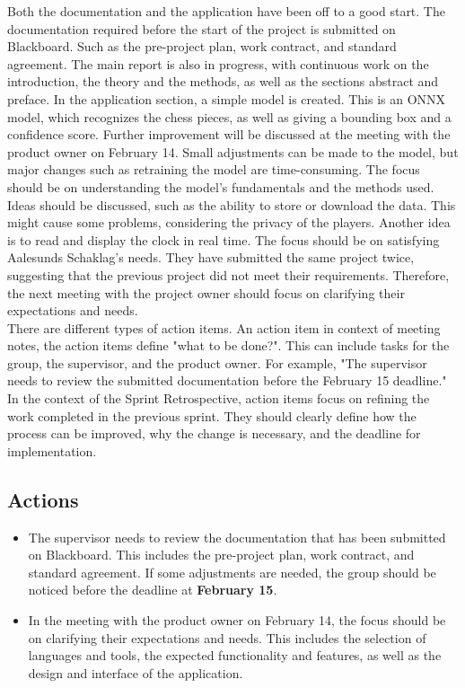 Both the documentation and the application have been off to a good start. The documentation required before the start of the project is submitted on Blackboard. Such as the pre-project plan, work contract, and standard agreement. The main report is also in progress, with continuous work on the introduction, the theory and the methods, as well as the sections abstract and preface. In the application section, a simple model is created. This is an ONNX model, which recognizes the chess pieces, as well as giving a bounding box and a confidence score. Further improvement will be discussed at the meeting with the product owner on February 14. Small adjustments can be made to the model, but major changes such as retraining the model are time-consuming. The focus should be on understanding the model's fundamentals and the methods used. Ideas should be discussed, such as the ability to store or download the data. This might cause some problems, considering the privacy of the players. Another idea is to read and display the clock in real time. The focus should be on satisfying Aalesunds Schaklag's needs. They have submitted the same project twice, suggesting that the previous project did not meet their requirements. Therefore, the next meeting with the project owner should focus on clarifying their expectations and needs. \\

There are different types of action items. An action item in context of meeting notes, the action items define "what to be done?". This can include tasks for the group, the supervisor, and the product owner. For example, "The supervisor needs to review the submitted documentation before the February 15 deadline." \\

In the context of the Sprint Retrospective, action items focus on refining the work completed in the previous sprint. They should clearly define how the process can be improved, why the change is necessary, and the deadline for implementation.

\subsection{Actions}
\begin{itemize}
    \item The supervisor needs to review the documentation that has been submitted on Blackboard. This includes the pre-project plan, work contract, and standard agreement. If some adjustments are needed, the group should be noticed before the deadline at \textbf{February 15}.
    \item In the meeting with the product owner on February 14, the focus should be on clarifying their expectations and needs. This includes the selection of languages and tools, the expected functionality and features, as well as the design and interface of the application.
\end{itemize}

